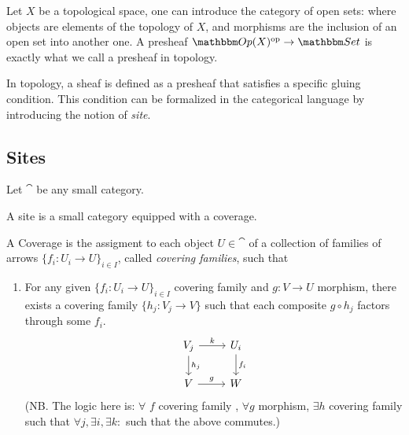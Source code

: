 \documentclass[a4paper,11pt]{article}  %
\begin{document}
\begin{example}\label{ex:topolo-presheaf}
Let $X$ be a topological space, one can introduce the category of open sets:
%
	{ }
%
where objects are elements of the topology of $X$, and morphisms are the inclusion of an open set into another one.
A presheaf $\cat[Op](X)^\op \to \Set$ is exactly what we call a presheaf in topology.
\end{example}
In topology, a sheaf is defined as a presheaf that satisfies a specific gluing condition. 
This condition can be formalized in the categorical language by introducing the notion of \emph{site}.


\subsection{Sites}
%
Let $\cat$ be any small category.

\begin{definition}[Site]
	A site is a small category equipped with a coverage.
\end{definition}

\begin{definition}[Coverage]\label{Def:coverage}
	A Coverage is the assigment to each object $U \in \cat$ of a collection of families of arrows $\{f_i:U_i\to U\}_{i\in I}$, called \emph{covering families}, such that
\begin{enumerate}
	\item For any given $\{f_i:U_i\to U\}_{i\in I}$ covering family and $g:V\to U$ morphism, there exists a covering family $\{h_j:V_j\to V\}$ such that each composite $g \circ h_j$ factors through some $f_i$.
	\begin{displaymath}
		\begin{tikzcd}
		V_j \ar[r,"k"] \ar[d,"h_j"] & U_i \ar[d,"f_i"] \\
		V \ar[r,"g"] & W
		\end{tikzcd}
	\end{displaymath}
	(NB. The logic here is: $\forall$ $f$ covering family , $\forall g$ morphism, $\exists h$ covering family such that $ \forall j, \exists i, \exists k \colon$ such that the above commutes.)
\end{enumerate}
\end{definition}
\end{document}
